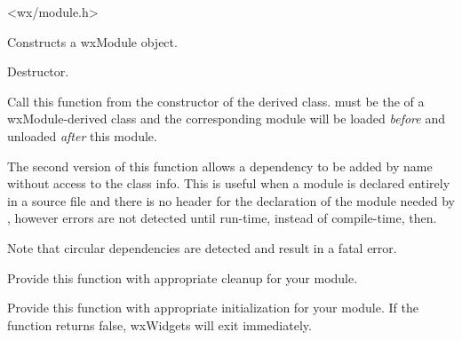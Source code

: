 


<wx/module.h>





\label{wxmodulector}


Constructs a wxModule object.


\label{wxmoduledtor}


Destructor.


\label{wxmoduleadddependency}



Call this function from the constructor of the derived class.  must be
the  of a wxModule-derived class and the
corresponding module will be loaded \emph{before} and unloaded \emph{after}
this module.

The second version of this function allows a dependency to be added by
name without access to the class info.  This is useful when a module is
declared entirely in a source file and there is no header for the declaration
of the module needed by , however errors are
not detected until run-time, instead of compile-time, then.

Note that circular dependencies are detected and result in a fatal error.





\label{wxmoduleonexit}


Provide this function with appropriate cleanup for your module.


\label{wxmoduleoninit}


Provide this function with appropriate initialization for your module. If the function
returns false, wxWidgets will exit immediately.

